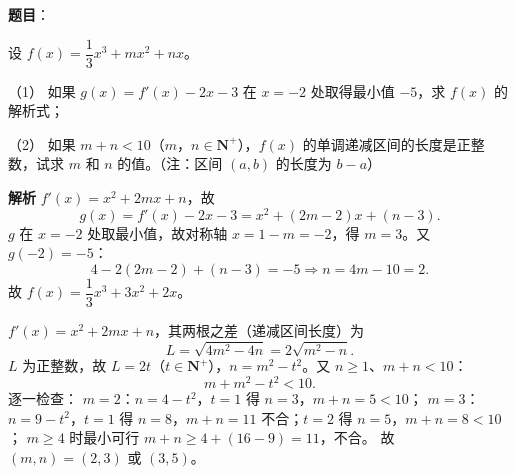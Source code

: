 \begin{answer}

\textbf{题目}：

设 $f(x)=\dfrac13x^3+mx^2+nx$。

（1） 如果 $g(x)=f'(x)-2x-3$ 在 $x=-2$ 处取得最小值 $-5$，求 $f(x)$ 的解析式；

（2） 如果 $m+n<10$（$m$，$n\in\mathbf N^+$），$f(x)$ 的单调递减区间的长度是正整数，试求 $m$ 和 $n$ 的值。（注：区间 $(a,b)$ 的长度为 $b-a$）

\textbf{解析}
$f'(x)=x^2+2mx+n$，故
\nopagebreak[4]
\[g(x)=f'(x)-2x-3=x^2+(2m-2)x+(n-3).\]
$g$ 在 $x=-2$ 处取最小值，故对称轴 $x=1-m=-2$，得 $m=3$。又 $g(-2)=-5$：
\nopagebreak[4]
\[4-2(2m-2)+(n-3)=-5\Longrightarrow n=4m-10=2.\]
故 $f(x)=\dfrac13x^3+3x^2+2x$。

$f'(x)=x^2+2mx+n$，其两根之差（递减区间长度）为
\nopagebreak[4]
\[L=\sqrt{4m^2-4n}=2\sqrt{m^2-n}.\]
$L$ 为正整数，故 $L=2t$（$t\in\mathbf N^+$），$n=m^2-t^2$。又 $n\geqslant1$、$m+n<10$：
\nopagebreak[4]
\[m+m^2-t^2<10.\]
逐一检查：
$m=2$：$n=4-t^2$，$t=1$ 得 $n=3$，$m+n=5<10$；
$m=3$：$n=9-t^2$，$t=1$ 得 $n=8$，$m+n=11$ 不合；$t=2$ 得 $n=5$，$m+n=8<10$；
$m\geqslant4$ 时最小可行 $m+n\geqslant4+(16-9)=11$，不合。
故 $(m,n)=(2,3)$ 或 $(3,5)$。



\end{answer}

